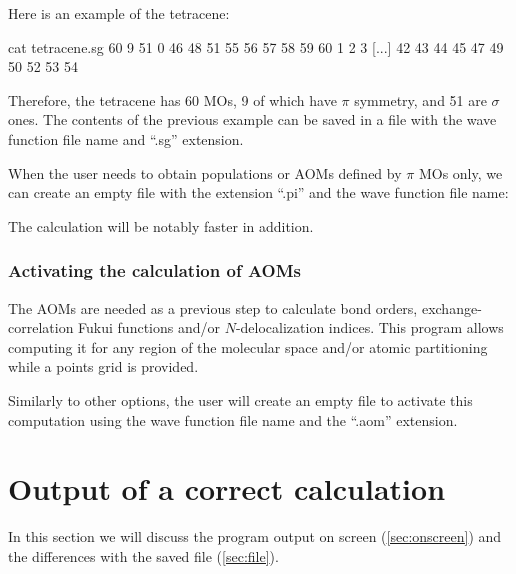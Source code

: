 \documentclass[a4paper,11pt,openany]{memoir}
\begin{document}
Here is an example of the tetracene:
	\begin{consola}{cat tetracene.sg}
60 9 51 0
46 48 51 55 56 57 58 59 60
1 2 3 [...] 42 43 44 45 47 49 50 52 53 54
	\end{consola}
Therefore, the tetracene has 60 \acp{MO}, 9 of which have $\pi$ symmetry, and 51 are $\sigma$ ones. The contents of the previous example can be saved in a file with the wave function file name and ``.sg'' extension.

When the user needs to obtain populations or \acp{AOM} defined by $\pi$ \acp{MO} only, we can create an empty file with the extension ``.pi'' and the wave function file name:

The calculation will be notably faster in addition.

\subsection{Activating the calculation of \acfp{AOM}}
The \acfp{AOM} are needed as a previous step to calculate bond orders, exchange-correlation Fukui functions and/or $N$-delocalization indices. This program allows computing it for any region of the molecular space and/or atomic partitioning while a points grid is provided.

Similarly to other options, the user will create an empty file to activate this computation using the wave function file name and the ``.aom'' extension.

\chapter{Output of a correct calculation}\label{chap:output}
In this section we will discuss the program output on screen (\autoref{sec:onscreen}) and the differences with the saved file (\autoref{sec:file}).
\end{document}
